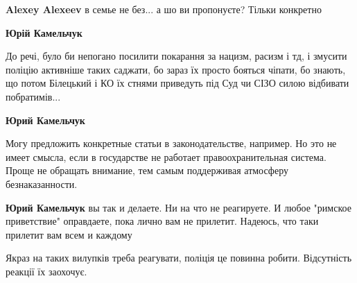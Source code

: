 \begin{itemize}
\begin{itemize}
\textbf{Alexey Alexeev} в семье не без... а шо ви пропонуєте? Тільки конкретно

 
\textbf{Юрій Камельчук} 

До речі, було би непогано посилити покарання за нацизм, расизм і тд, і змусити
поліцію активніше таких саджати, бо зараз їх просто бояться чіпати, бо знають,
що потом Білецький і КО їх стнями приведуть під Суд чи СІЗО силою відбивати
побратимів...


 
\textbf{Юрий Камельчук} 

Могу предложить конкретные статьи в законодательстве, например. Но это не имеет
смысла, если в государстве не работает правоохранительная система. Проще не
обращать внимание, тем самым поддерживая атмосферу безнаказанности.


 
\textbf{Юрий Камельчук} вы так и делаете. Ни на что не реагируете. И любое
"римское приветствие" оправдаете, пока лично вам не прилетит. Надеюсь, что таки
прилетит вам всем и каждому

 
Якраз на таких вилупків треба реагувати, поліція це повинна робити. Відсутність реакції їх заохочує.

 

\end{itemize}
\end{itemize}
